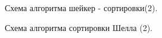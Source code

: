 \documentclass[a4paper]{article}
\begin{document}
		
	\begin{figure}[h]
		\caption{Схема алгоритма шейкер - сортировки(2). \centering}
		\label{image3}
	\end{figure}	
	
	
	\begin{figure}[h]
		\caption{Схема алгоритма сортировки Шелла (2). \centering}
		\label{image4}
	\end{figure}	
	\clearpage
	
\end{document}
